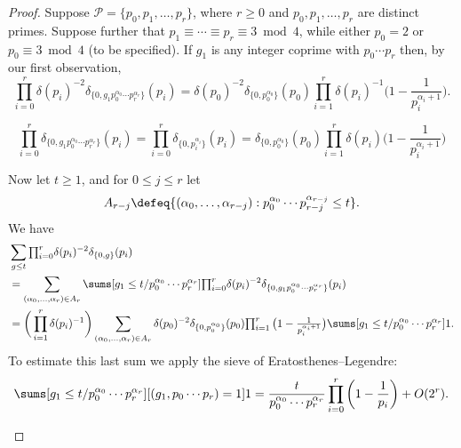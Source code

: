 \documentclass[12pt, reqno, twoside, letterpaper]{amsart}
\begin{document}
\begin{jetsam}
\begin{proof}
Suppose $\mathscr{P} = \{p_0,p_1,\ldots,p_r\}$, where $r \ge 0$ 
and $p_0,p_1,\ldots,p_r$ are distinct primes.
%
Suppose further that 
$p_1 \equiv \cdots \equiv p_r \equiv 3 \bmod 4$, while either 
$p_0 = 2$ or $p_0 \equiv 3 \bmod 4$ (to be specified).
%
If $g_1$ is any integer coprime with $p_0\cdots p_r$ then, by our 
first observation, 
\begin{equation*}
  \prod_{i = 0}^r
   \delta(p_i)^{-2}\delta_{\{0,g_1p_0^{\alpha_0}\cdots p_r^{\alpha_r}\}}(p_i)
    =
     \delta(p_0)^{-2}\delta_{\{0,p_0^{\alpha_0}\}}(p_0)
      \prod_{i = 1}^r\delta(p_i)^{-1}\bigg(1 - \frac{1}{p_i^{\alpha_i + 1}}\bigg).
\end{equation*}
%
\begin{nixnix}
\begin{equation*}
  \prod_{i = 0}^r
   \delta_{\{0,g_1p_0^{\alpha_0}\cdots p_r^{\alpha_r}\}}(p_i)
   =
     \prod_{i = 0}^r\delta_{\{0,p_i^{\alpha_i}\}}(p_i)
   =
        \delta_{\{0,p_0^{\alpha_0}\}}(p_0)
         \prod_{i = 1}^r\delta(p_i)\bigg(1 - \frac{1}{p_i^{\alpha_i + 1}}\bigg) 
\end{equation*}
\end{nixnix}
%
Now let $t \ge 1$, and for $0 \le j \le r$ let 
\[
 A_{r - j}
  \defeq 
   \{(\alpha_0,\ldots,\alpha_{r - j}) : p_0^{\alpha_0}\cdots p_{r - j}^{\alpha_{r - j}} \le t\}.
\]
%
We have 
\begin{align*}
  &
    \sum_{g \le t}
    {\textstyle \prod_{i = 0}^r } \delta(p_i)^{-2}\delta_{\{0,g\}}(p_i) 
  \\
  & = 
    \sum_{(\alpha_0,\ldots,\alpha_r) \in A_r}
     \sums[g_1 \le t/p_0^{\alpha_0}\cdots p_r^{\alpha_r}]
      {\textstyle \prod_{i = 0}^r } \delta(p_i)^{-2}\delta_{\{0,g_1p_0^{\alpha_0}\cdots p_r^{\alpha_r}\}}(p_i)
 \\
  & = 
   \bigg(\prod_{i = 1}^r \delta(p_i)^{-1}\bigg)
    \sum_{(\alpha_0,\ldots,\alpha_r) \in A_r}
     \delta(p_0)^{-2}\delta_{\{0,p_0^{\alpha_0}\}}(p_0)
      {\textstyle \prod_{i = 1}^r\big(1 - \frac{1}{p_i^{\alpha_i + 1}}\big)}
       \sums[g_1 \le t/p_0^{\alpha_0}\cdots p_r^{\alpha_r}] 1.
\end{align*}
%
To estimate this last sum we apply the sieve of 
Eratosthenes--Legendre: 
\begin{equation*}
  \sums[g_1 \le t/p_0^{\alpha_0}\cdots p_r^{\alpha_r}][(g_1,p_0\cdots p_r) = 1] 1
 =
   \frac{t}{p_0^{\alpha_0}\cdots p_r^{\alpha_r}}
   \prod_{i = 0}^r\bigg(1 - \frac{1}{p_i}\bigg)
    + 
     O(2^r).
\end{equation*}
%
\begin{nixnix}

\end{nixnix}
\end{proof}
\end{jetsam}
\end{document}
